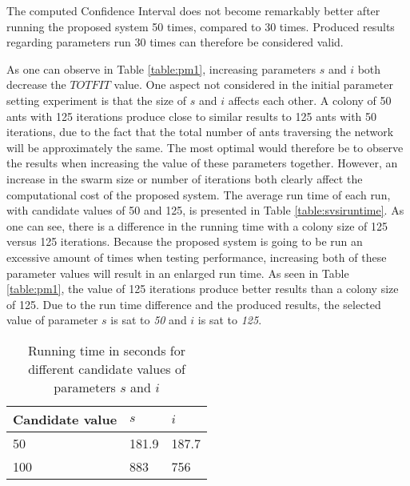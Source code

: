 The computed Confidence Interval does not become remarkably better after running the proposed system 50 times, compared to 30 times. Produced results regarding parameters run 30 times can therefore be considered valid.
\newline

As one can observe in Table \vref{table:pm1}, increasing parameters $s$ and $i$ both decrease the $TOTFIT$ value. One aspect not considered in the initial parameter setting experiment is that the size of $s$ and $i$ affects each other. A colony of 50 ants with 125 iterations produce close to similar results to 125 ants with 50 iterations, due to the fact that the total number of ants traversing the network will be approximately the same. The most optimal would therefore be to observe the results when increasing the value of these parameters together. However, an increase in the swarm size or number of iterations both clearly affect the computational cost of the proposed system. The average run time of each run, with candidate values of 50 and 125, is presented in Table \vref{table:svsiruntime}. As one can see, there is a difference in the running time with a colony size of 125 versus 125 iterations. Because the proposed system is going to be run an excessive amount of times when testing performance, increasing both of these parameter values will result in an enlarged run time. As seen in Table \ref{table:pm1}, the value of 125 iterations produce better results than a colony size of 125. Due to the run time difference and the produced results, the selected value of parameter $s$ is sat to \textit{50} and $i$ is sat to \textit{125}.

\begin{table}[H]
    \centering
    \begin{tabular}{|l|l|l|}
    \hline
    \textbf{Candidate value} & \textbf{$s$} & \textbf{$i$}\\
    \hline
    50 & 181.9 & 187.7 \\
    100 & 883 & 756\\
    \hline
    \end{tabular}
    \caption {Running time in seconds for different candidate values of parameters $s$ and $i$}
    \label{table:svsirun time}
    \end{table}



